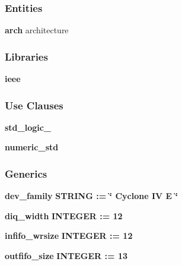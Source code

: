 \subsubsection*{Entities}
\begin{DoxyCompactItemize}
\item 
{\bf arch} architecture
\end{DoxyCompactItemize}
\subsubsection*{Libraries}
 \begin{DoxyCompactItemize}
\item 
{\bf ieee} 
\end{DoxyCompactItemize}
\subsubsection*{Use Clauses}
 \begin{DoxyCompactItemize}
\item 
{\bf std\+\_\+logic\+\_}   
\item 
{\bf numeric\+\_\+std}   
\end{DoxyCompactItemize}
\subsubsection*{Generics}
 \begin{DoxyCompactItemize}
\item 
{\bf dev\+\_\+family} {\bfseries {\bfseries \textcolor{comment}{S\+T\+R\+I\+NG}\textcolor{vhdlchar}{ }\textcolor{vhdlchar}{ }\textcolor{vhdlchar}{\+:}\textcolor{vhdlchar}{=}\textcolor{vhdlchar}{ }\textcolor{vhdlchar}{ }\textcolor{vhdlchar}{ }\textcolor{vhdlchar}{ }\textcolor{keyword}{\char`\"{} Cyclone I\+V E \char`\"{}}\textcolor{vhdlchar}{ }}}
\item 
{\bf diq\+\_\+width} {\bfseries {\bfseries \textcolor{comment}{I\+N\+T\+E\+G\+ER}\textcolor{vhdlchar}{ }\textcolor{vhdlchar}{ }\textcolor{vhdlchar}{\+:}\textcolor{vhdlchar}{=}\textcolor{vhdlchar}{ }\textcolor{vhdlchar}{ } \textcolor{vhdldigit}{12} \textcolor{vhdlchar}{ }}}
\item 
{\bf infifo\+\_\+wrsize} {\bfseries {\bfseries \textcolor{comment}{I\+N\+T\+E\+G\+ER}\textcolor{vhdlchar}{ }\textcolor{vhdlchar}{ }\textcolor{vhdlchar}{\+:}\textcolor{vhdlchar}{=}\textcolor{vhdlchar}{ }\textcolor{vhdlchar}{ } \textcolor{vhdldigit}{12} \textcolor{vhdlchar}{ }}}
\item 
{\bf outfifo\+\_\+size} {\bfseries {\bfseries \textcolor{comment}{I\+N\+T\+E\+G\+ER}\textcolor{vhdlchar}{ }\textcolor{vhdlchar}{ }\textcolor{vhdlchar}{\+:}\textcolor{vhdlchar}{=}\textcolor{vhdlchar}{ }\textcolor{vhdlchar}{ } \textcolor{vhdldigit}{13} \textcolor{vhdlchar}{ }}}
\end{DoxyCompactItemize}
